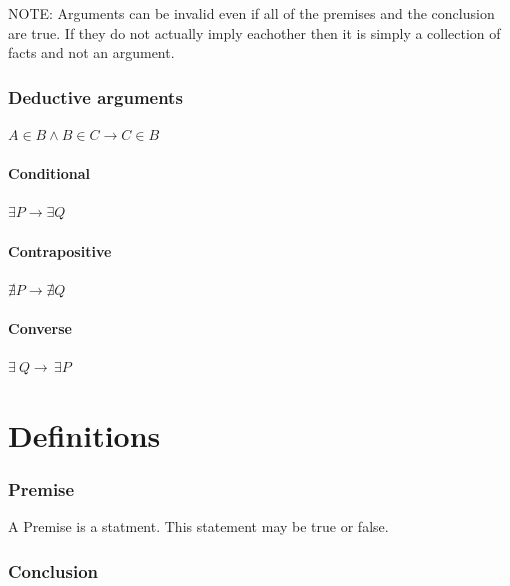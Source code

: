 \documentclass[]{article}
\let\oldparagraph\paragraph
\renewcommand{\paragraph}[1]{\oldparagraph{#1}\mbox{}}
\begin{document}
NOTE: Arguments can be invalid even if all of the premises and the
conclusion are true. If they do not actually imply eachother then it is
simply a collection of facts and not an argument.

\hypertarget{deductive-arguments}{%
\subsubsection{Deductive arguments}\label{deductive-arguments}}

\(A \in B \wedge B \in C \rightarrow C \in B\)

\hypertarget{conditional}{%
\paragraph{Conditional}\label{conditional}}

\(\exists P \rightarrow \exists Q\)

\hypertarget{contrapositive}{%
\paragraph{Contrapositive}\label{contrapositive}}

\(\nexists P \rightarrow \nexists Q\)

\hypertarget{converse}{%
\paragraph{Converse}\label{converse}}

\(\exists ~ Q \rightarrow \, \exists P\)

\hypertarget{definitions}{%
\section{Definitions}\label{definitions}}

\hypertarget{premise}{%
\subsubsection{Premise}\label{premise}}

A Premise is a statment. This statement may be true or false.

\hypertarget{conclusion}{%
\subsubsection{Conclusion}\label{conclusion}}
\end{document}
